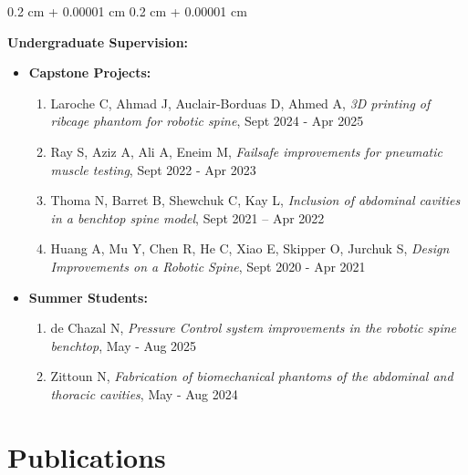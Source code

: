 \documentclass[10pt, letterpaper]{article}
\newenvironment{onecolentry}{
    \begin{adjustwidth}{
        0.2 cm + 0.00001 cm
    }{
        0.2 cm + 0.00001 cm
    }
}{
    \end{adjustwidth}
} %
\begin{document}
   \begin{onecolentry}
        \textbf{Undergraduate Supervision:}
        \begin{itemize}[label={}]
            \item \textbf{Capstone Projects:}
        \begin{enumerate}
            \item Laroche C, Ahmad J, Auclair-Borduas D, Ahmed A, \textit{3D printing of ribcage phantom for robotic spine}, Sept 2024 - Apr 2025            
            \item Ray S, Aziz A, Ali A, Eneim M, \textit{Failsafe improvements for pneumatic muscle testing}, Sept 2022 - Apr 2023
            \item Thoma N, Barret B, Shewchuk C, Kay L, \textit{Inclusion of abdominal cavities in a benchtop spine model}, Sept 2021 – Apr 2022
            \item Huang A, Mu Y, Chen R, He C, Xiao E, Skipper O, Jurchuk S, \textit{Design Improvements on a Robotic Spine}, Sept 2020 - Apr 2021
        \end{enumerate}

        \item \textbf{Summer Students:}
        
        \begin{enumerate}
            \item de Chazal N, \textit{Pressure Control system improvements in the robotic spine benchtop}, May - Aug 2025
            \item Zittoun N, \textit{Fabrication of biomechanical phantoms of the abdominal and thoracic cavities}, May - Aug 2024
            
        \end{enumerate}
        
        \end{itemize}
        \end{onecolentry}




  



   \section{Publications}
\end{document}
